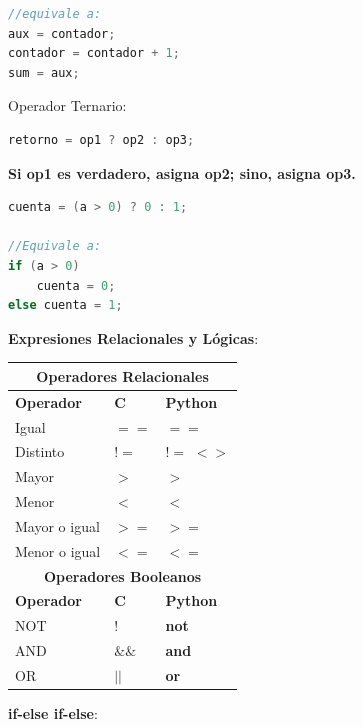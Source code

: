 \documentclass{article}
\begin{document}
\begin{itemize}
\begin{minipage}[h]{0.45\textwidth}
\begin{lstlisting}[language=C, basicstyle=\scriptsize]
//equivale a:
aux = contador;
contador = contador + 1;
sum = aux;
\end{lstlisting}
\end{minipage}
\newpage
\item Operador Ternario:

\begin{minipage}[h]{0.45\textwidth}
\begin{lstlisting}[language=C, basicstyle=\scriptsize] 
retorno = op1 ? op2 : op3;  
\end{lstlisting}
{\scriptsize \textbf{Si op1 es verdadero, asigna op2; sino, asigna op3.}}\\
\end{minipage}
\hspace{0.5cm}
\begin{minipage}[h]{0.45\textwidth}
\begin{lstlisting}[language=C, basicstyle=\scriptsize] 
cuenta = (a > 0) ? 0 : 1;

//Equivale a:
if (a > 0)
	cuenta = 0;
else cuenta = 1;
\end{lstlisting}
\end{minipage}

\begin{minipage}[h]{0.45\textwidth}
\item \textbf{Expresiones Relacionales y Lógicas}:

\begin{tabular}{|l|l|l|}\hline \hline
	\multicolumn{3}{|c|}{\textbf{Operadores Relacionales}} \\ \hline
	\textbf{Operador} &\textbf{C} & \textbf{Python}   \\ \hline 
	Igual         & $==$  & $==$  \\  \hline
	Distinto       & $!=$ & $!=$ $<>$ \\  \hline
	Mayor          & $>$ & $>$  \\  \hline
	Menor       & $<$ & $<$ \\  \hline
	Mayor o igual   & $>=$ & $>=$  \\  \hline
	Menor o igual   & $<=$ & $<=$  \\  \hline
	\multicolumn{3}{|c|}{\textbf{Operadores Booleanos}} \\ \hline
	\textbf{Operador} &\textbf{C}  & \textbf{Python}   \\ \hline 
	NOT   & !  &   \textbf{not} \\  \hline
	AND   & $\&\&$  & \textbf{and}  \\  \hline
	OR   & $||$  & \textbf{or}  \\  \hline
\end{tabular}
\end{minipage}
\hspace{0.5cm}
\begin{minipage}[h]{0.45\textwidth}
\item \textbf{if-else if-else}:


\end{minipage}
\end{itemize}
\end{document}
